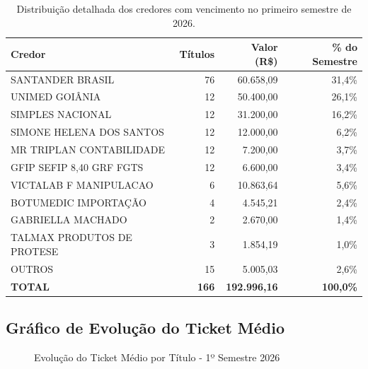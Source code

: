 \documentclass[12pt, a4paper]{article}
\begin{document}
\begin{table}[H]
    \centering
    \renewcommand{\arraystretch}{1.3}
    \begin{tabularx}{\textwidth}{X r r r}
        \toprule
        \rowcolor{tableHeader} \textbf{Credor} & \textbf{Títulos} & \textbf{Valor (R\$)} & \textbf{\% do Semestre} \\
        \midrule
        SANTANDER BRASIL & 76 & 60.658,09 & 31,4\% \\
        UNIMED GOIÂNIA & 12 & 50.400,00 & 26,1\% \\
        SIMPLES NACIONAL & 12 & 31.200,00 & 16,2\% \\
        SIMONE HELENA DOS SANTOS & 12 & 12.000,00 & 6,2\% \\
        MR TRIPLAN CONTABILIDADE & 12 & 7.200,00 & 3,7\% \\
        GFIP SEFIP 8,40 GRF FGTS & 12 & 6.600,00 & 3,4\% \\
        VICTALAB F MANIPULACAO & 6 & 10.863,64 & 5,6\% \\
        BOTUMEDIC IMPORTAÇÃO & 4 & 4.545,21 & 2,4\% \\
        GABRIELLA MACHADO & 2 & 2.670,00 & 1,4\% \\
        TALMAX PRODUTOS DE PROTESE & 3 & 1.854,19 & 1,0\% \\
        OUTROS & 15 & 5.005,03 & 2,6\% \\
        \midrule
        \rowcolor{lightGray} \textbf{TOTAL} & \textbf{166} & \textbf{192.996,16} & \textbf{100,0\%} \\
        \bottomrule
    \end{tabularx}
    \caption*{\footnotesize Distribuição detalhada dos credores com vencimento no primeiro semestre de 2026.}
\end{table}

\subsection{Gráfico de Evolução do Ticket Médio}

\begin{figure}[H]
    \centering
    \caption{Evolução do Ticket Médio por Título - 1º Semestre 2026}
\end{figure}
\end{document}
